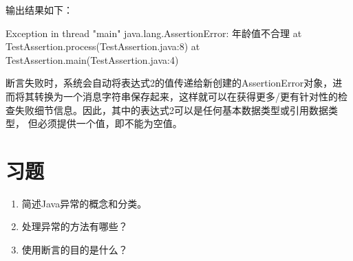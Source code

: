 输出结果如下：

\begin{stdoutCode}
Exception in thread "main" java.lang.AssertionError: 年龄值不合理
	at TestAssertion.process(TestAssertion.java:8)
	at TestAssertion.main(TestAssertion.java:4)  
\end{stdoutCode}


断言失败时，系统会自动将表达式2的值传递给新创建的AssertionError对象，进
而将其转换为一个消息字符串保存起来，这样就可以在获得更多/更有针对性的检
查失败细节信息。因此，其中的表达式2可以是任何基本数据类型或引用数据类型，
但必须提供一个值，即不能为空值。

\section*{习题}

\sline
\begin{enumerate}
\item 简述Java异常的概念和分类。
\item 处理异常的方法有哪些？
\item 使用断言的目的是什么？
\end{enumerate}
\sline


